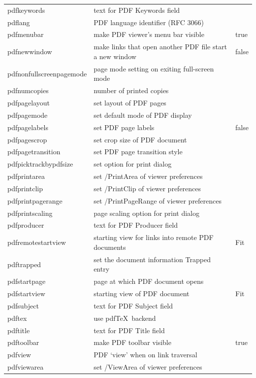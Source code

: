 \documentclass[a4paper,11pt]{article}
\newcommand{\optempty}{{\rmfamily\textit{empty}}}
\begin{document}
\begin{longtable}{@{}>{\ttfamily}lp{70mm}>{\ttfamily}l@{}}
pdfkeywords &text for PDF Keywords field&\optempty\\
pdflang &PDF language identifier (RFC 3066)&\optempty\\
pdfmenubar &make PDF  viewer's menu bar visible&true\\
pdfnewwindow &make links that open another PDF file start a new window&false\\
pdfnonfullscreenpagemode &page mode setting on exiting full-screen mode&\optempty\\
pdfnumcopies &number of printed copies&\optempty\\
pdfpagelayout &set layout of PDF pages&\optempty\\
pdfpagemode &set default mode of PDF display&\optempty\\
pdfpagelabels &set PDF page labels&false\\
pdfpagescrop &set crop size of PDF document&\optempty\\
pdfpagetransition &set PDF page transition style&\optempty\\
pdfpicktrackbypdfsize &set option for print dialog&\optempty\\
pdfprintarea &set /PrintArea of viewer preferences&\optempty\\
pdfprintclip &set /PrintClip of viewer preferences&\optempty\\
pdfprintpagerange &set /PrintPageRange of viewer preferences&\optempty\\
pdfprintscaling &page scaling option for print dialog&\optempty\\
pdfproducer &text for PDF Producer field&\optempty\\
pdfremotestartview & starting view for links into remote PDF documents&Fit\\
pdftrapped & set the document information Trapped entry&\optempty\\
pdfstartpage &page at which PDF document opens&1\\
pdfstartview &starting view of PDF document& Fit\\
pdfsubject &text for PDF Subject field&\optempty\\
pdftex &use pdf\TeX\ backend\\
pdftitle &text for PDF Title field&\optempty\\
pdftoolbar &make PDF toolbar visible&true\\
pdfview &PDF `view' when on link traversal&\optempty\\
pdfviewarea &set /ViewArea of viewer preferences&\optempty\\

\end{longtable}
\end{document}
